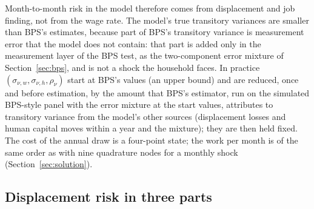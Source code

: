\documentclass[11pt]{article}
\newcommand{\1}{\mathbf{1}}
\begin{document}
Month-to-month risk in the model therefore comes from displacement and job finding, not from the wage rate. The model's
true transitory variances are smaller than BPS's estimates, because part of BPS's transitory variance is measurement error
that the model does not contain: that part is added only in the measurement layer of the BPS test, as the two-component
error mixture of Section~\ref{sec:bps}, and is not a shock the household faces. In practice $(\sigma_{\nu,w},
\sigma_{\nu,h}, \rho_\nu)$ start at BPS's values (an upper bound) and are reduced, once and before estimation, by the
amount that BPS's estimator, run on the simulated BPS-style panel with the error mixture at the start values, attributes
to transitory variance from the model's other sources (displacement losses and human capital moves within a year and
the mixture); they are then held fixed. The cost of the annual draw is a four-point state; the work per month is of the
same order as with nine quadrature nodes for a monthly shock (Section~\ref{sec:solution}).

\subsection{Displacement risk in three parts}
\end{document}
